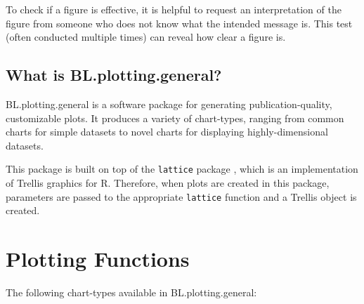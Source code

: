 \documentclass[letterpaper]{article}\usepackage[]{graphicx}\usepackage[]{color}
\begin{document}
To check if a figure is effective, it is helpful to request an interpretation of the figure from someone who does not know what the intended message is. This test (often conducted multiple times) can reveal how clear a figure is.

\subsection{What is BL.plotting.general?}
BL.plotting.general is a software package for generating publication-quality, customizable plots. It produces a variety of chart-types, ranging from common charts for simple datasets to novel charts for displaying highly-dimensional datasets.

This package is built on top of the \texttt{lattice} package \cite{lattice}, which is an implementation of Trellis graphics for R. Therefore, when plots are created in this package, parameters are passed to the appropriate \texttt{lattice} function and a Trellis object is created. 

\section{Plotting Functions}
The following  chart-types available in BL.plotting.general:
\end{document}
